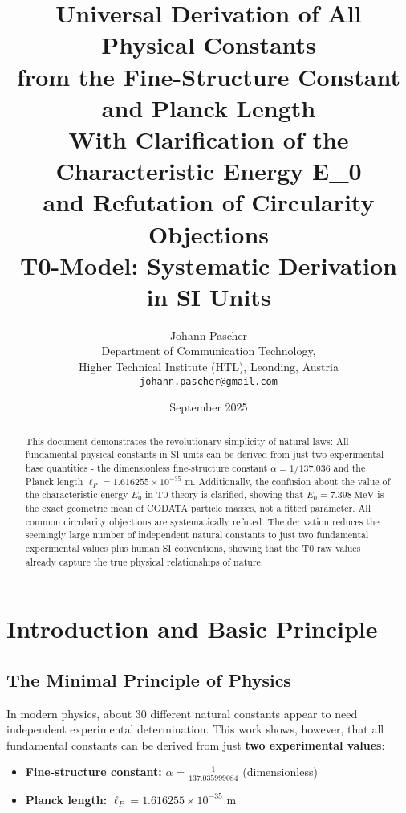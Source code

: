 \documentclass[12pt,a4paper]{article}
\title{\textbf{Universal Derivation of All Physical Constants\\from the Fine-Structure Constant and Planck Length}\\[0.5cm]
	\large With Clarification of the Characteristic Energy E\_0\\and Refutation of Circularity Objections\\[0.3cm]
	\normalsize T0-Model: Systematic Derivation in SI Units}
\author{Johann Pascher\\
	\small Department of Communication Technology,\\
	\small Higher Technical Institute (HTL), Leonding, Austria\\
	\small \texttt{johann.pascher@gmail.com}}
\date{September 2025}
\theoremstyle{definition}
\begin{document}
	
	\maketitle
	
	\begin{abstract}
		This document demonstrates the revolutionary simplicity of natural laws: All fundamental physical constants in SI units can be derived from just two experimental base quantities - the dimensionless fine-structure constant $\alpha = 1/137.036$ and the Planck length $\ell_P = 1.616255 \times 10^{-35}$ m. Additionally, the confusion about the value of the characteristic energy $E_0$ in T0 theory is clarified, showing that $E_0 = \SI{7.398}{\MeV}$ is the exact geometric mean of CODATA particle masses, not a fitted parameter. All common circularity objections are systematically refuted. The derivation reduces the seemingly large number of independent natural constants to just two fundamental experimental values plus human SI conventions, showing that the T0 raw values already capture the true physical relationships of nature.
	\end{abstract}
	
	\tableofcontents
	\newpage
	
	\section{Introduction and Basic Principle}
	
	\subsection{The Minimal Principle of Physics}
	
	In modern physics, about 30 different natural constants appear to need independent experimental determination. This work shows, however, that all fundamental constants can be derived from just \textbf{two experimental values}:
	
	\begin{tcolorbox}[colback=blue!5!white,colframe=blue!75!black,title=Fundamental Input Data]
		\begin{itemize}
			\item \textbf{Fine-structure constant:} $\alpha = \frac{1}{137.035999084}$ (dimensionless)
			\item \textbf{Planck length:} $\ell_P = 1.616255 \times 10^{-35}$ \si{\meter}
		\end{itemize}
	\end{tcolorbox}
	
\end{document}
